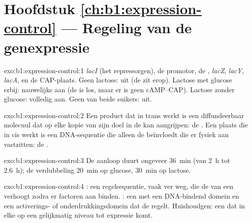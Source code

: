 \section*{Hoofdstuk \ref{ch:b1:expression-control} --- Regeling van de genexpressie}

\begin{solution}{exo:b1:expression-control:1}
\emph{lacI} (het repressorgen), de promotor, de , \emph{lacZ},
\emph{lacY}, \emph{lacA}, en de CAP-plaats. Geen lactose: uit (de  zit
erop). Lactose met glucose erbij: nauwelijks aan (de  is los, maar er is
geen cAMP--CAP). Lactose zonder glucose: volledig aan. Geen van beide suikers: uit.
\end{solution}

\begin{solution}{exo:b1:expression-control:2}
Een product dat in trans werkt is een diffundeerbaar molecuul dat op elke kopie van
zijn doel in de  kan aangrijpen: de . Een plaats die in cis werkt is een
DNA-sequentie die alleen de  beïnvloedt die er fysiek aan vastzitten: de
.
\end{solution}

\begin{solution}{exo:b1:expression-control:3}
De aanloop duurt ongeveer \qty{36}{min} (van \qty{2}{h} tot \qty{2.6}{h}); de
verdubbeling \qty{20}{min} op glucose, \qty{30}{min} op lactose.
\end{solution}

\begin{solution}{exo:b1:expression-control:4}
: een regelsequentie, vaak ver weg, die de  van een 
verhoogt zodra er factoren aan binden. : een  met een
DNA-bindend domein en een activerings- of onderdrukkingsdomein dat de 
regelt. Huishoudgen: een  dat in elke  op een gelijkmatig niveau tot expressie
komt.
\end{solution}

